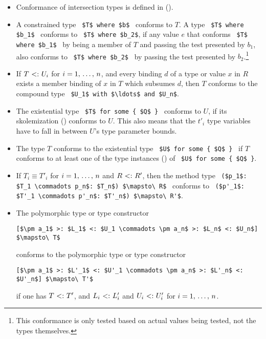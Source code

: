 \begin{itemize}
  \item Conformance of intersection types is defined in ().

  \item A constrained type ~\lstinline!$T$ where $b$!~ conforms to $T$. A type ~\lstinline!$T$ where $b_1$!~ conforms to ~\lstinline!$T$ where $b_2$!, if any value $e$ that conforms ~\lstinline!$T$ where $b_1$!~ by being a member of $T$ and passing the test presented by $b_1$, also conforms to ~\lstinline!$T$ where $b_2$!~ by passing the test presented by $b_2$.\footnote{This conformance is only tested based on actual values being tested, not the types themselves.}

  \item If $T \conforms U_i$ for $i = 1 ,\, \ldots ,\, n$, and every binding $d$ of a type or value $x$ in $R$ exists a member binding of $x$ in $T$ which subsumes $d$, then $T$ conforms to the compound type ~\lstinline!$U_1$ with $\ldots$ and $U_n$!. 

  \item The existential type ~\lstinline!$T$ for some { $Q$ }!~ conforms to $U$, if its skolemization () conforms to $U$. This also means that the $t'_i$ type variables have to fall in between $U$'s type parameter bounds. 

  \item The type $T$ conforms to the existential type ~\lstinline!$U$ for some { $Q$ }!~ if $T$ conforms to at least one of the type instances () of ~\lstinline!$U$ for some { $Q$ }!. 

  \item If $T_i \equiv T'_i$ for $i = 1 ,\, \ldots ,\, n$ and $R \conforms R'$, then the method type ~\lstinline!($p_1$: $T_1 \commadots p_n$: $T_n$) $\mapsto\ R$!~ conforms to ~\lstinline!($p'_1$: $T'_1 \commadots p'_n$: $T'_n$) $\mapsto\ R'$!. 

  \item The polymorphic type or type constructor 
\begin{lstlisting}
[$\pm a_1$ >: $L_1$ <: $U_1 \commadots \pm a_n$ >: $L_n$ <: $U_n$] $\mapsto\ T$
\end{lstlisting}
conforms to the polymorphic type or type constructor 
\begin{lstlisting}
[$\pm a_1$ >: $L'_1$ <: $U'_1 \commadots \pm a_n$ >: $L'_n$ <: $U'_n$] $\mapsto\ T'$
\end{lstlisting}
if one has $T \conforms T'$, and $L_i \conforms L'_i$ and $U_i \conforms U'_i$ for $i = 1 ,\, \ldots ,\, n$. 


\end{itemize}
